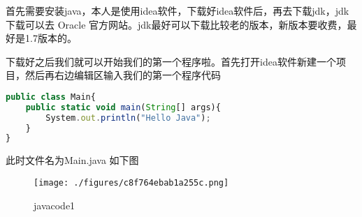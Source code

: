 

首先需要安装java，本人是使用idea软件，下载好idea软件后，再去下载jdk，jdk下载可以去 Oracle 官方网站。jdk最好可以下载比较老的版本，新版本要收费，最好是1.7版本的。

下载好之后我们就可以开始我们的第一个程序啦。首先打开idea软件新建一个项目，然后再右边编辑区输入我们的第一个程序代码
\begin{lstlisting}[language=js]
public class Main{
    public static void main(String[] args){
        System.out.println("Hello Java");
    }
}
\end{lstlisting}
此时文件名为Main.java
如下图\begin{figure}[ht]
\centering
\texttt{[image: ./figures/c8f764ebab1a255c.png]}
\caption{javacode1} \label{fig_java_1}
\end{figure}
